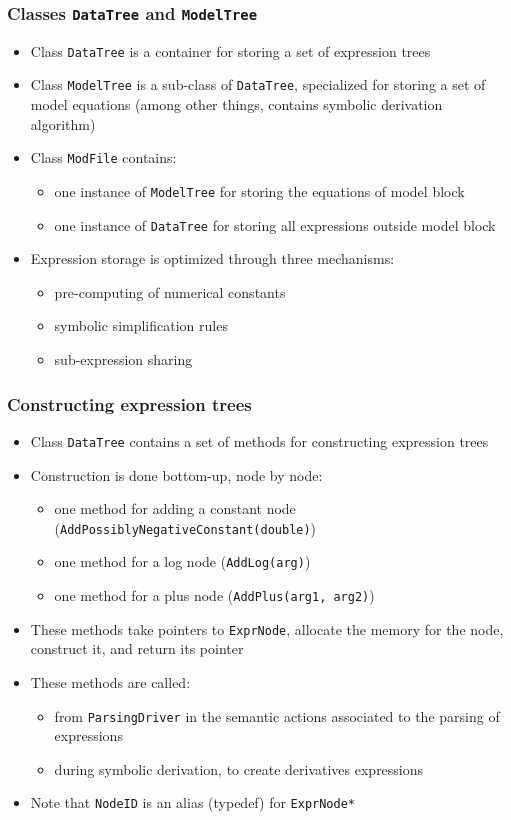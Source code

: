 \documentclass{beamer}
\begin{document}
\begin{frame}
  \frametitle{Classes \texttt{DataTree} and \texttt{ModelTree}}
  \begin{itemize}
  \item Class \texttt{DataTree} is a container for storing a set of expression trees
  \item Class \texttt{ModelTree} is a sub-class of \texttt{DataTree}, specialized for storing a set of model equations (among other things, contains symbolic derivation algorithm)
  \item Class \texttt{ModFile} contains:
    \begin{itemize}
    \item one instance of \texttt{ModelTree} for storing the equations of model block
    \item one instance of \texttt{DataTree} for storing all expressions outside model block
    \end{itemize}
  \item Expression storage is optimized through three mechanisms:
    \begin{itemize}
    \item pre-computing of numerical constants
    \item symbolic simplification rules
    \item sub-expression sharing
    \end{itemize}
  \end{itemize}
\end{frame}

\begin{frame}
  \frametitle{Constructing expression trees}
  \begin{itemize}
  \item Class \texttt{DataTree} contains a set of methods for constructing expression trees
  \item Construction is done bottom-up, node by node:
    \begin{itemize}
    \item one method for adding a constant node (\texttt{AddPossiblyNegativeConstant(double)})
    \item one method for a log node (\texttt{AddLog(arg)})
    \item one method for a plus node (\texttt{AddPlus(arg1, arg2)})
    \end{itemize}
  \item These methods take pointers to \texttt{ExprNode}, allocate the memory for the node, construct it, and return its pointer
  \item These methods are called:
    \begin{itemize}
    \item from \texttt{ParsingDriver} in the semantic actions associated to the parsing of expressions
    \item during symbolic derivation, to create derivatives expressions
    \end{itemize}
  \item Note that \texttt{NodeID} is an alias (typedef) for \texttt{ExprNode*}
  \end{itemize}
\end{frame}
\end{document}
